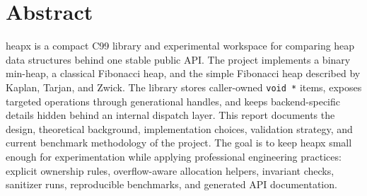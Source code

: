 \documentclass[11pt,a4paper]{report}
\title{\projecttitle}
\author{heapx project}
\date{\today}
\newenvironment{projectabstract}
    {\chapter*{Abstract}\addcontentsline{toc}{chapter}{Abstract}}
    {\clearpage}
\begin{document}
\maketitle
\setcounter{page}{2}

\begin{projectabstract}
    heapx is a compact C99 library and experimental workspace for comparing heap data structures behind one stable public API.
    The project implements a binary min-heap, a classical Fibonacci heap, and the simple Fibonacci heap described by Kaplan, Tarjan, and Zwick.
    The library stores caller-owned \texttt{void *} items, exposes targeted operations through generational handles, and keeps backend-specific details hidden behind an internal dispatch layer.
    This report documents the design, theoretical background, implementation choices, validation strategy, and current benchmark methodology of the project.
    The goal is to keep heapx small enough for experimentation while applying professional engineering practices: explicit ownership rules, overflow-aware allocation helpers, invariant checks, sanitizer runs, reproducible benchmarks, and generated API documentation.
\end{projectabstract}

\tableofcontents
\newpage
{}
















\end{document}
